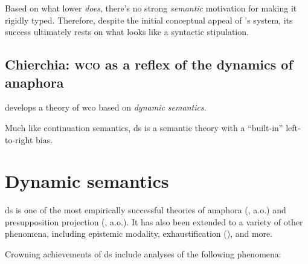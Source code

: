 \documentclass[nols,twoside,nofonts,nobib,nohyper]{tufte-handout}
\begin{document}
Based on what lower \textit{does}, there's no strong \textit{semantic}
motivation for making it rigidly typed. Therefore, despite the initial
conceptual appeal of \citeauthor{barkerShan2015}'s system, its success
ultimately rests on what looks like a syntactic stipulation.

\subsection{Chierchia: \textsc{wco} as a reflex of the dynamics of anaphora}

\citet{chierchia2020} develops a theory of \ac{wco} based on \textit{dynamic
  semantics}.

Much like continuation semantics, \ac{ds} is a semantic theory with a
\enquote{built-in} left-to-right bias.

\section{Dynamic semantics}


\ac{ds} is one of the most empirically successful theories of anaphora
(\citealt{heim1982,groenendijk_dynamic_1991,dekker1994}, a.o.) and
presupposition projection (\citealt{heim1983,beaver_presupposition_2001}, a.o.).
It has also been extended to a variety of other phenomena, including epistemic
modality, exhaustification (\citealt{elliott-twosouls}),
and more.

Crowning achievements of \ac{ds} include analyses of the following
phenomena:
\end{document}

